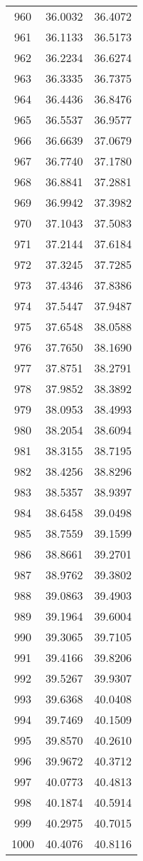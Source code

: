 \documentclass{article}
\begin{document}
\begin{longtable}{|c|c|c|}
960 & 36.0032 & 36.4072 \\
961 & 36.1133 & 36.5173 \\
962 & 36.2234 & 36.6274 \\
963 & 36.3335 & 36.7375 \\
964 & 36.4436 & 36.8476 \\
965 & 36.5537 & 36.9577 \\
966 & 36.6639 & 37.0679 \\
967 & 36.7740 & 37.1780 \\
968 & 36.8841 & 37.2881 \\
969 & 36.9942 & 37.3982 \\
970 & 37.1043 & 37.5083 \\
971 & 37.2144 & 37.6184 \\
972 & 37.3245 & 37.7285 \\
973 & 37.4346 & 37.8386 \\
974 & 37.5447 & 37.9487 \\
975 & 37.6548 & 38.0588 \\
976 & 37.7650 & 38.1690 \\
977 & 37.8751 & 38.2791 \\
978 & 37.9852 & 38.3892 \\
979 & 38.0953 & 38.4993 \\
980 & 38.2054 & 38.6094 \\
981 & 38.3155 & 38.7195 \\
982 & 38.4256 & 38.8296 \\
983 & 38.5357 & 38.9397 \\
984 & 38.6458 & 39.0498 \\
985 & 38.7559 & 39.1599 \\
986 & 38.8661 & 39.2701 \\
987 & 38.9762 & 39.3802 \\
988 & 39.0863 & 39.4903 \\
989 & 39.1964 & 39.6004 \\
990 & 39.3065 & 39.7105 \\
991 & 39.4166 & 39.8206 \\
992 & 39.5267 & 39.9307 \\
993 & 39.6368 & 40.0408 \\
994 & 39.7469 & 40.1509 \\
995 & 39.8570 & 40.2610 \\
996 & 39.9672 & 40.3712 \\
997 & 40.0773 & 40.4813 \\
998 & 40.1874 & 40.5914 \\
999 & 40.2975 & 40.7015 \\
1000 & 40.4076 & 40.8116 \\
\hline
\end{longtable}
\end{document}
